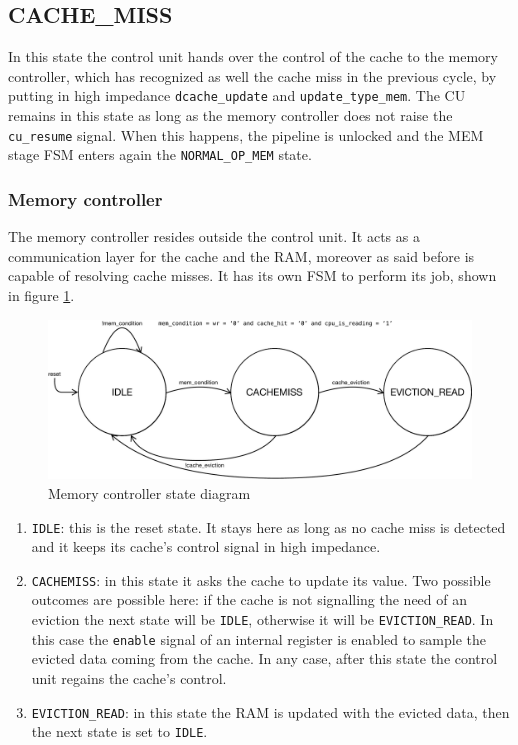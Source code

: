 \subsection{CACHE\_MISS}
\label{subsec:cache_miss}

In this state the control unit hands over the control of the cache to the memory controller, which has recognized as well the cache miss in the previous cycle, by putting in high impedance \verb|dcache_update| and \verb|update_type_mem|.
The CU remains in this state as long as the memory controller does not raise the \verb|cu_resume| signal. When this happens, the pipeline is unlocked and the MEM stage FSM enters again the \verb|NORMAL_OP_MEM| state.

\subsubsection{Memory controller}

The memory controller resides outside the control unit. It acts as a communication layer for the cache and the RAM, moreover as said before is capable of resolving cache misses. It has its own FSM to perform its job,
shown in figure \ref{fig:memcontroller_fsm}.

\begin{figure}[!ht]
	\centering
	\includegraphics[width=0.8\linewidth]{./chapters/figures/memcontroller_fsm.pdf}
    \caption{Memory controller state diagram}
    \label{fig:memcontroller_fsm}
\end{figure}

\begin{enumerate}
    \item \verb|IDLE|: this is the reset state. It stays here as long as no cache miss is detected and it keeps its cache's control signal in high impedance.
    \item \verb|CACHEMISS|: in this state it asks the cache to update its value. Two possible outcomes are possible here: if the cache is not signalling the need of an eviction the next state will be \verb|IDLE|,
    otherwise it will be \verb|EVICTION_READ|. In this case the \verb|enable| signal of an internal register is enabled to sample the evicted data coming from the cache. In any case, after this state the control unit
    regains the cache's control.

    \item \verb|EVICTION_READ|: in this state the RAM is updated with the evicted data, then the next state is set to \verb|IDLE|. 
\end{enumerate}

